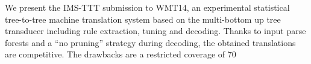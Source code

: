 We present the IMS-TTT submission to WMT14, an experimental statistical tree-to-tree machine translation system based on the multi-bottom up tree transducer including rule extraction, tuning and decoding.  Thanks to input parse forests and a ``no pruning'' strategy during decoding, the obtained translations are competitive.  The drawbacks are a restricted coverage of 70\\%
